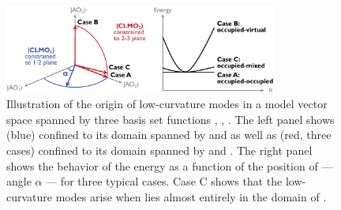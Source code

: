 \documentclass[aps,prl,twocolumn,reprint,amsmath,amssymb]{revtex4-1}
\begin{document}
\begin{figure}
\centering
\includegraphics[width=0.8\textwidth]{modes}
\caption{Illustration of the origin of low-curvature modes in a model vector space spanned by three basis set functions , , . The left panel shows  (blue) confined to its domain spanned by  and  as well as   (red, three cases) confined to its domain spanned by  and . The right panel shows the behavior of the energy as a function of the position of  --- angle $\alpha$ --- for three typical cases. Case C shows that the low-curvature modes arise when   lies almost entirely in the domain of .}
\label{fig:modes}
\end{figure}


\label{marker:nature} 
\end{document}
